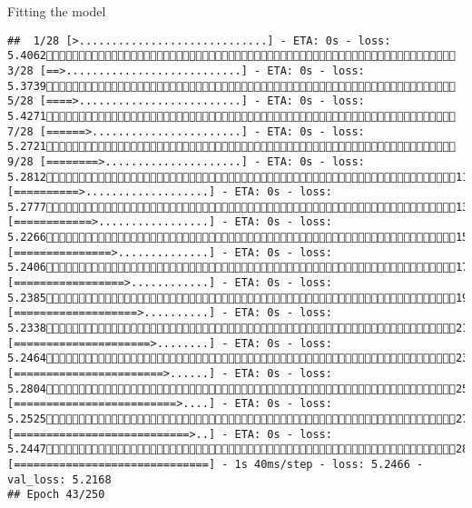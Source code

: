 \documentclass[
  ignorenonframetext,
]{beamer}
\begin{document}
\begin{frame}[fragile]{Fitting the model}
\begin{verbatim}
##  1/28 [>.............................] - ETA: 0s - loss: 5.4062 3/28 [==>...........................] - ETA: 0s - loss: 5.3739 5/28 [====>.........................] - ETA: 0s - loss: 5.4271 7/28 [======>.......................] - ETA: 0s - loss: 5.2721 9/28 [========>.....................] - ETA: 0s - loss: 5.281211/28 [==========>...................] - ETA: 0s - loss: 5.277713/28 [============>.................] - ETA: 0s - loss: 5.226615/28 [===============>..............] - ETA: 0s - loss: 5.240617/28 [=================>............] - ETA: 0s - loss: 5.238519/28 [===================>..........] - ETA: 0s - loss: 5.233821/28 [=====================>........] - ETA: 0s - loss: 5.246423/28 [=======================>......] - ETA: 0s - loss: 5.280425/28 [=========================>....] - ETA: 0s - loss: 5.252527/28 [===========================>..] - ETA: 0s - loss: 5.244728/28 [==============================] - 1s 40ms/step - loss: 5.2466 - val_loss: 5.2168
## Epoch 43/250

\end{verbatim}
\end{frame}
\end{document}
